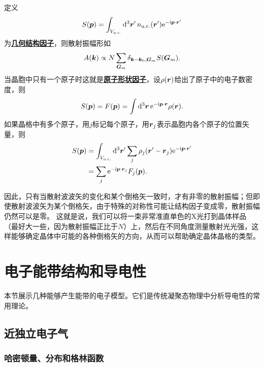 \documentclass[hyperref, UTF8, a4paper]{ctexart}
\newcommand*{\ii}{\mathrm{i}}
\newcommand*{\ee}{\mathrm{e}}
\newcommand*{\concept}[1]{\underline{\textbf{#1}}}
\begin{document}
定义
\begin{equation}
    S(\vb*{p}) = \int_{V_{\text{u.c.}}} \dd[3]{\vb*{r}'} n_\text{u.c.}(\vb*{r}') \ee^{-\ii \vb*{p} \cdot \vb*{r}'}
\end{equation}
为\concept{几何结构因子}，则散射振幅形如
\begin{equation}
    A(\vb*{k}) \propto N \sum_{\vb*{G}_m} \delta_{\vb*{k} - \vb*{k}_0, \vb*{G}_m} S(\vb*{G}_m).
\end{equation}
当晶胞中只有一个原子时这就是\concept{原子形状因子}，设$\rho(\vb*{r})$给出了原子中的电子数密度，则
\begin{equation}
    S(\vb*{p}) = F(\vb*{p}) = \int \dd[3]{\vb*{r}} \ee^{-\ii \vb*{p} \cdot \vb*{r}} \rho(\vb*{r}).
\end{equation}
如果晶格中有多个原子，用$j$标记每个原子，用$\vb*{r}_j$表示晶胞内各个原子的位置矢量，则
\begin{equation}
    \begin{aligned}
        S(\vb*{p}) &= \int_{V_{\text{u.c.}}} \dd[3]{\vb*{r}'} \sum_j \rho_j(\vb*{r}' - \vb*{r}_j) \ee^{-\ii \vb*{p} \cdot \vb*{r}'} \\
        &= \sum_j \ee^{-\ii \vb*{p} \cdot \vb*{r}_j} F_j(\vb*{p}).
    \end{aligned}
\end{equation}

因此，只有当散射波波矢的变化和某个倒格矢一致时，才有非零的散射振幅；但即使散射波波矢为某个倒格矢，由于特殊的对称性可能让结构因子变成零，散射振幅仍然可以是零。
这就是说，我们可以将一束非常准直单色的X光打到晶体样品（最好大一些，因为散射振幅正比于$N$）上，然后在不同角度测量散射光光强，这样能够确定晶体中可能的各种倒格矢的方向，从而可以帮助确定晶体晶格的类型。

\section{电子能带结构和导电性}

本节展示几种能够产生能带的电子模型。它们是传统凝聚态物理中分析导电性的常用理论。


\subsection{近独立电子气}

\subsubsection{哈密顿量、分布和格林函数}
\end{document}
